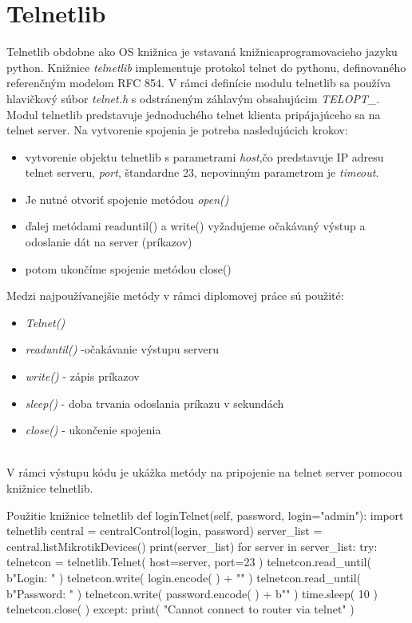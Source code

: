 \section{Telnetlib}
Telnetlib \cite{telnetlib} obdobne ako OS knižnica je vstavaná knižnicaprogramovacieho jazyku python. Knižnice \textit{telnetlib} implementuje protokol telnet do pythonu, definovaného referenčným modelom RFC 854. V rámci definície modulu telnetlib sa používa hlavičkový súbor \textit{telnet.h} s odstráneným záhlavým obsahujúcim \textit{TELOPT\_}. \\Modul telnetlib predstavuje jednoduchého telnet klienta pripájajúceho sa na telnet server. Na vytvorenie spojenia je potreba nasledujúcich krokov:
\begin{itemize}
\item vytvorenie objektu telnetlib s parametrami \textit{host},čo predstavuje IP adresu telnet serveru, \textit{port}, štandardne 23, nepovinným parametrom je \textit{timeout}. 
\item Je nutné otvoriť spojenie metódou \textit{open()}
\item ďalej metódami readuntil() a write() vyžadujeme očakávaný výstup a odoslanie dát na server (príkazov)
\item potom ukončíme spojenie metódou close()
\end{itemize}
Medzi najpoužívanejšie metódy v rámci diplomovej práce sú použité:
\begin{itemize}
\item  \textit{Telnet()}
\item \textit{readuntil()} -očakávanie výstupu serveru
\item \textit{write()} - zápis príkazov
\item \textit{sleep()} - doba trvania odoslania príkazu v sekundách
\item \textit{close()} - ukončenie spojenia
\end{itemize}
\\
V rámci výstupu kódu je ukážka metódy na pripojenie na telnet server pomocou knižnice telnetlib.
\\
\begin{sexylisting}{Použitie knižnice telnetlib}
def loginTelnet(self, password, login="admin"):
 import telnetlib
 central = centralControl(login, password)
 server_list = central.listMikrotikDevices()
 print(server_list)
 for server in server_list:
 try:
  telnetcon = telnetlib.Telnet( host=server, port=23 )
  telnetcon.read_until( b"Login: " )
  telnetcon.write( login.encode( ) + "\n" )
  telnetcon.read_until( b"Password: " )
  telnetcon.write( password.encode( ) + b"\n" )
  time.sleep( 10 )
  telnetcon.close( )
 except:
  print( "Cannot connect to router via telnet" )
\end{sexylisting} 
